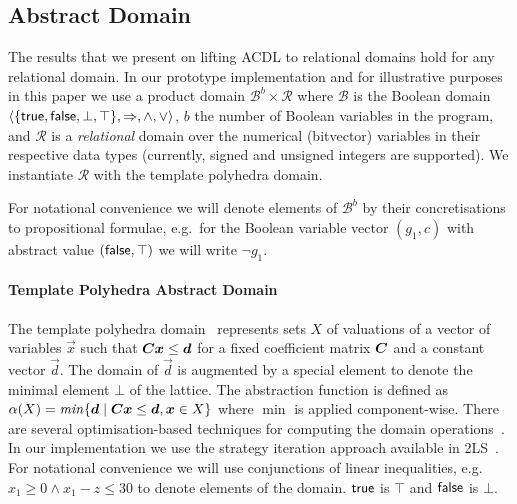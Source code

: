 \subsection{Abstract Domain}
The results that we present on lifting ACDL to relational domains hold
for any relational domain.
% 
In our prototype implementation and for illustrative purposes in this
paper we use a product domain $\mathcal{B}^b\times\mathcal{R}$ where
$\mathcal{B}$ is the Boolean domain
$\langle\{\mathsf{true},\mathsf{false},\bot,\top\},\Rightarrow,\wedge,\vee\rangle$,
$b$ the number of Boolean variables in the program, and $\mathcal{R}$
is a \emph{relational} domain over the numerical (bitvector) variables
in their respective data types (currently, signed and unsigned
integers are supported).
%
We instantiate $\mathcal{R}$ with the template polyhedra domain.

For notational convenience we will denote elements of
$\mathcal{B}^b$ by their concretisations to propositional formulae,
e.g.\ for the Boolean variable vector $(g_1,c)$ with abstract value
$(\mathsf{false},\top)$ we will write $\neg g_1$.

\paragraph{Template Polyhedra Abstract Domain}
%
The template polyhedra domain~\cite{sriram} represents sets $X$ of
valuations of a vector of variables $\vec{x}$ such that
${\boldsymbol C}{\boldsymbol x}\leq{\boldsymbol d}$ for a fixed coefficient matrix ${\boldsymbol C}$
and a constant vector $\vec{d}$. The domain of $\vec{d}$ is augmented
by a special element to denote the minimal element $\bot$ of the lattice.
%
The abstraction function is defined as $\alpha(X) = \mathit{min} \{{\boldsymbol d}\mid
{\boldsymbol C}{\boldsymbol x}\leq{\boldsymbol d}, {\boldsymbol x}\in X\}$ where $\min$ is
applied component-wise. There are several optimisation-based
techniques for computing the domain
operations~\cite{sriram,GS07b,BJKS15}. In our implementation we use
the strategy iteration approach available in 2LS~\cite{BJKS15}.
%
For notational convenience we will use conjunctions of linear
inequalities, e.g.\ $x_1\geq 0 \wedge x_1-z\leq 30$ to denote elements
of the domain. $\mathsf{true}$ is $\top$ and $\mathsf{false}$ is $\bot$.

